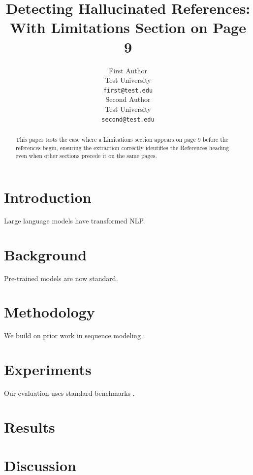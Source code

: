 \documentclass[11pt]{article}
\title{Detecting Hallucinated References: With Limitations Section on Page 9}
\author{First Author \\
  Test University \\
  \texttt{first@test.edu} \\\And
  Second Author \\
  Test University \\
  \texttt{second@test.edu} \\}
\begin{document}
\maketitle

\begin{abstract}
This paper tests the case where a Limitations section appears on page 9 before the references begin, ensuring the extraction correctly identifies the References heading even when other sections precede it on the same pages.
\end{abstract}

\section{Introduction}
\lipsum[1-3]
Large language models \cite{devlin-etal-2019-bert,vaswani-etal-2017-attention,brown-etal-2020-language} have transformed NLP.

\lipsum[4-6]

\section{Background}
\lipsum[7-10]
Pre-trained models \cite{liu2019roberta,raffel-etal-2020-exploring,wolf-etal-2020-transformers} are now standard.

\lipsum[11-14]

\section{Methodology}
\lipsum[15-18]
We build on prior work in sequence modeling \cite{lewis-etal-2020-bart,mikolov-etal-2013-distributed}.

\lipsum[19-22]

\section{Experiments}
\lipsum[23-26]
Our evaluation uses standard benchmarks \cite{pennington-etal-2014-glove,peters-etal-2018-deep}.

\lipsum[27-30]

\section{Results}
\lipsum[31-34]

\section{Discussion}
\lipsum[35-38]
\end{document}
